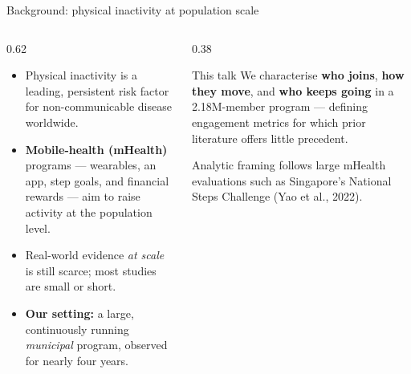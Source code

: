 \documentclass[10pt,aspectratio=169]{beamer}
\newcommand{\hi}[1]{{\color{teal}\bfseries #1}}
\begin{document}
\begin{frame}{Background: physical inactivity at population scale}
  \begin{columns}[T]
    \begin{column}{0.62\textwidth}
      \begin{itemize}
        \item Physical inactivity is a leading, persistent risk factor for non-communicable disease worldwide.
        \item \textbf{Mobile-health (mHealth)} programs --- wearables, an app, step goals, and financial rewards --- aim to raise activity at the population level.
        \item Real-world evidence \emph{at scale} is still scarce; most studies are small or short.
        \item \textbf{Our setting:} a large, continuously running \emph{municipal} program, observed for nearly four years.
      \end{itemize}
    \end{column}
    \begin{column}{0.38\textwidth}
      \begin{block}{This talk}
        We characterise \hi{who joins}, \hi{how they move}, and \hi{who keeps going} in a 2.18M-member program --- defining engagement metrics for which prior literature offers little precedent.
      \end{block}
      {\color{graytx}\scriptsize Analytic framing follows large mHealth evaluations such as Singapore's National Steps Challenge (Yao et al., 2022).}
    \end{column}
  \end{columns}
\end{frame}
\end{document}

